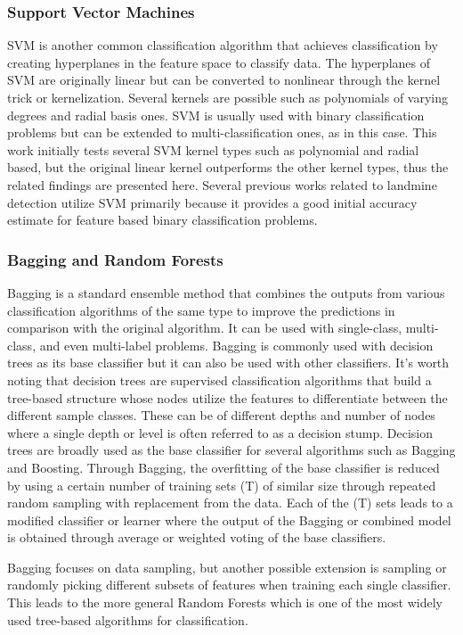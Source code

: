 \documentclass{ieeeaccess}
\begin{document}
\subsubsection*{Support Vector Machines}
SVM is another common classification algorithm that achieves classification by creating hyperplanes in the feature space to classify data. The hyperplanes of SVM are originally linear but can be converted to nonlinear through the kernel trick or kernelization. Several kernels are possible such as polynomials of varying degrees and radial basis ones. SVM is usually used with binary classification problems but can be extended to multi-classification ones, as in this case. This work initially tests several SVM kernel types such as polynomial and radial based, but the original linear kernel outperforms the other kernel types, thus the related findings are presented here. Several previous works related to landmine detection utilize SVM primarily because it provides a good initial accuracy estimate for feature based binary classification problems.

\subsubsection*{Bagging and Random Forests}
Bagging is a standard ensemble method that combines the outputs from various classification algorithms of the same type to improve the predictions in comparison with the original algorithm. It can be used with single-class, multi-class, and even multi-label problems. Bagging is commonly used with decision trees as its base classifier but it can also be used with other classifiers. It’s worth noting that decision trees are supervised classification algorithms that build a tree-based structure whose nodes utilize the features to differentiate between the different sample classes. These can be of different depths and number of nodes where a single depth or level is often referred to as a decision stump. Decision trees are broadly used as the base classifier for several algorithms such as Bagging and Boosting. Through Bagging, the overfitting of the base classifier is reduced by using a certain number of training sets (T) of similar size through repeated random sampling with replacement from the data. Each of the (T) sets leads to a modified classifier or learner where the output of the Bagging or combined model is obtained through average or weighted voting of the base classifiers.

Bagging focuses on data sampling, but another possible extension is sampling or randomly picking different subsets of features when training each single classifier. This leads to the more general Random Forests which is one of the most widely used tree-based algorithms for classification.
\end{document}
